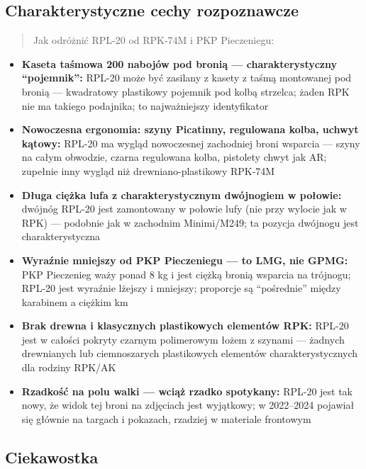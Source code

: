 \documentclass[12pt,oneside]{book}
\providecommand{\tightlist}{%
  \setlength{\itemsep}{0pt}\setlength{\parskip}{0pt}}
\begin{document}
\subsection{Charakterystyczne cechy
rozpoznawcze}\label{charakterystyczne-cechy-rozpoznawcze-70}

\begin{quote}
Jak odróżnić RPL-20 od RPK-74M i PKP Pieczeniegu:
\end{quote}

\begin{itemize}
\tightlist
\item
  \textbf{Kaseta taśmowa 200 nabojów pod bronią --- charakterystyczny
  ``pojemnik'':} RPL-20 może być zasilany z kasety z taśmą montowanej
  pod bronią --- kwadratowy plastikowy pojemnik pod kolbą strzelca;
  żaden RPK nie ma takiego podajnika; to najważniejszy identyfikator
\item
  \textbf{Nowoczesna ergonomia: szyny Picatinny, regulowana kolba,
  uchwyt kątowy:} RPL-20 ma wygląd nowoczesnej zachodniej broni wsparcia
  --- szyny na całym obwodzie, czarna regulowana kolba, pistolety chwyt
  jak AR; zupełnie inny wygląd niż drewniano-plastikowy RPK-74M
\item
  \textbf{Długa ciężka lufa z charakterystycznym dwójnogiem w połowie:}
  dwójnóg RPL-20 jest zamontowany w połowie lufy (nie przy wylocie jak w
  RPK) --- podobnie jak w zachodnim Minimi/M249; ta pozycja dwójnogu
  jest charakterystyczna
\item
  \textbf{Wyraźnie mniejszy od PKP Pieczeniegu --- to LMG, nie GPMG:}
  PKP Pieczenieg waży ponad 8 kg i jest ciężką bronią wsparcia na
  trójnogu; RPL-20 jest wyraźnie lżejszy i mniejszy; proporcje są
  ``pośrednie'' między karabinem a ciężkim km
\item
  \textbf{Brak drewna i klasycznych plastikowych elementów RPK:} RPL-20
  jest w całości pokryty czarnym polimerowym łożem z szynami --- żadnych
  drewnianych lub ciemnoszarych plastikowych elementów
  charakterystycznych dla rodziny RPK/AK
\item
  \textbf{Rzadkość na polu walki --- wciąż rzadko spotykany:} RPL-20
  jest tak nowy, że widok tej broni na zdjęciach jest wyjątkowy; w
  2022--2024 pojawiał się głównie na targach i pokazach, rzadziej w
  materiale frontowym
\end{itemize}

\subsection{Ciekawostka}\label{ciekawostka-70}
\end{document}
